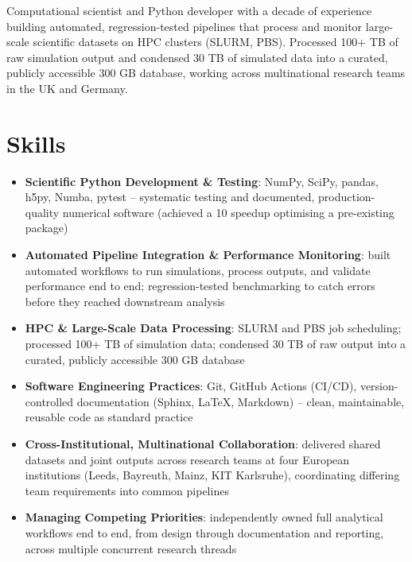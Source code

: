 \documentclass[11pt,a4paper,sans]{moderncv}
\begin{document}
\makecvtitle


\vspace{6pt}
\small{Computational scientist and Python developer with a decade of experience building automated, regression-tested pipelines that process and monitor large-scale scientific datasets on HPC clusters (SLURM, PBS). Processed 100+ TB of raw simulation output and condensed 30 TB of simulated data into a curated, publicly accessible 300 GB database, working across multinational research teams in the UK and Germany.}


\section{Skills}
\vspace{1pt}
\begin{itemize}

\item \textbf{Scientific Python Development \& Testing}: NumPy, SciPy, pandas, h5py, Numba, pytest -- systematic testing and documented, production-quality numerical software (achieved a 10\texttimes{} speedup optimising a pre-existing package)

\item \textbf{Automated Pipeline Integration \& Performance Monitoring}: built automated workflows to run simulations, process outputs, and validate performance end to end; regression-tested benchmarking to catch errors before they reached downstream analysis

\item \textbf{HPC \& Large-Scale Data Processing}: SLURM and PBS job scheduling; processed 100+ TB of simulation data; condensed 30 TB of raw output into a curated, publicly accessible 300 GB database

\item \textbf{Software Engineering Practices}: Git, GitHub Actions (CI/CD), version-controlled documentation (Sphinx, LaTeX, Markdown) -- clean, maintainable, reusable code as standard practice

\item \textbf{Cross-Institutional, Multinational Collaboration}: delivered shared datasets and joint outputs across research teams at four European institutions (Leeds, Bayreuth, Mainz, KIT Karlsruhe), coordinating differing team requirements into common pipelines

\item \textbf{Managing Competing Priorities}: independently owned full analytical workflows end to end, from design through documentation and reporting, across multiple concurrent research threads

\end{itemize}
\end{document}

